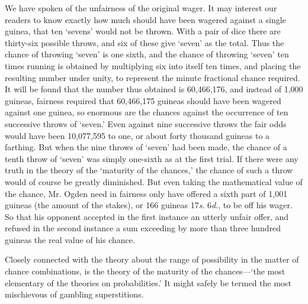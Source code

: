 \documentclass[letterpaper,12pt,oneside,openany]{memoir}
\begin{document}
We have spoken of the unfairness of the original
wager. It may interest our readers to know exactly
how much should have been wagered against a single
guinea, that ten `sevens' would not be thrown. With
a pair of dice there are thirty-six possible throws, and
six of these give `seven' as the total. Thus the chance
of throwing `seven' is one sixth, and the chance of
throwing `seven' ten times running is obtained by
multiplying six into itself ten times, and placing the
resulting number under unity, to represent the minute
fractional chance required. It will be found that the
number thus obtained is 60,466,176, and instead
of 1,000 guineas, fairness required that 60,466,175
guineas should have been wagered against one guinea,
so enormous are the chances against the occurrence of
ten successive throws of `seven.' Even against nine
successive throws the fair odds would have been
10,077,595 to one, or about forty thousand guineas to
a farthing. But when the nine throws of `seven' had
been made, the chance of a tenth throw of `seven' was
simply one-sixth as at the first trial. If there were
any truth in the theory of the `maturity of the chances,'
the chance of such a throw would of course be greatly
diminished. But even taking the mathematical value
of the chance, Mr. Ogden need in fairness only have
offered a sixth part of 1,001 guineas (the amount of the
stakes), or 166 guineas 17\textit{s}. 6\textit{d}., to be off his wager.
So that his opponent accepted in the first instance an
utterly unfair offer, and refused in the second instance a
sum exceeding by more than three hundred guineas the
real value of his chance.

Closely connected with the theory about the range
of possibility in the matter of chance combinations, is
the theory of the maturity of the chances---`the most
elementary of the theories on probabilities.' It might
safely be termed the most mischievous of gambling
superstitions.
\end{document}
